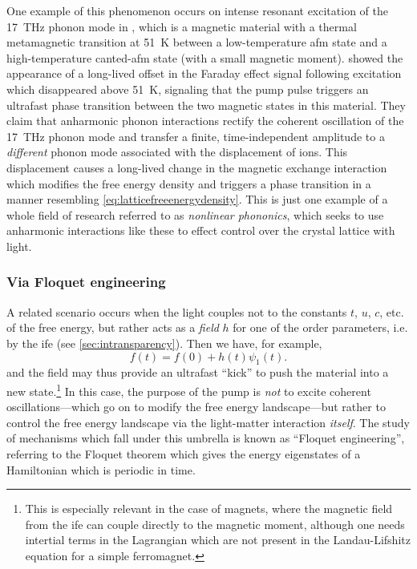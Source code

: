 One example of this phenomenon occurs on intense resonant excitation of the \qty{17}{THz} phonon mode in , which is a magnetic material with a thermal metamagnetic transition at \qty{51}{K} between a low-temperature \gls{afm} state and a high-temperature canted-\gls{afm} state (with a small magnetic moment).
 showed the appearance of a long-lived offset in the Faraday effect signal following excitation which disappeared above \qty{51}{K}, signaling that the pump pulse triggers an ultrafast phase transition between the two magnetic states in this material.
They claim that anharmonic phonon interactions rectify the coherent oscillation of the \qty{17}{THz} phonon mode and transfer a finite, time-independent amplitude to a \emph{different} phonon mode associated with the displacement of  ions.
This displacement causes a long-lived change in the magnetic exchange interaction which modifies the free energy density and triggers a phase transition in a manner resembling \cref{eq:latticefreeenergydensity}.
This is just one example of a whole field of research referred to as \emph{nonlinear phononics}\citep{forst_nonlinear_2011}, which seeks to use anharmonic interactions like these to effect control over the crystal lattice with light.

\subsubsection{Via Floquet engineering}

A related scenario occurs when the light couples not to the constants $t$, $u$, $c$, etc. of the free energy, but rather acts as a \emph{field} $h$ for one of the order parameters, i.e. by the \gls{ife} (see \cref{sec:intransparency}).
Then we have, for example,
\begin{equation}
f(t) = f(0)+h(t)\psi_1(t).
\end{equation}
and the field may thus provide an ultrafast ``kick'' to push the material into a new state.\footnote{This is especially relevant in the case of magnets, where the magnetic field from the \gls{ife} can couple directly to the magnetic moment, although one needs intertial terms in the Lagrangian which are not present in the Landau-Lifshitz equation for a simple ferromagnet\citep{kimel_inertia-driven_2009}.}
In this case, the purpose of the pump is \emph{not} to excite coherent oscillations---which go on to modify the free energy landscape---but rather to control the free energy landscape via the light-matter interaction \emph{itself}.
The study of mechanisms which fall under this umbrella is known as ``Floquet engineering''\citep{oka_floquet_2019}, referring to the Floquet theorem\citep{shirley_solution_1965} which gives the energy eigenstates of a Hamiltonian which is periodic in time.

